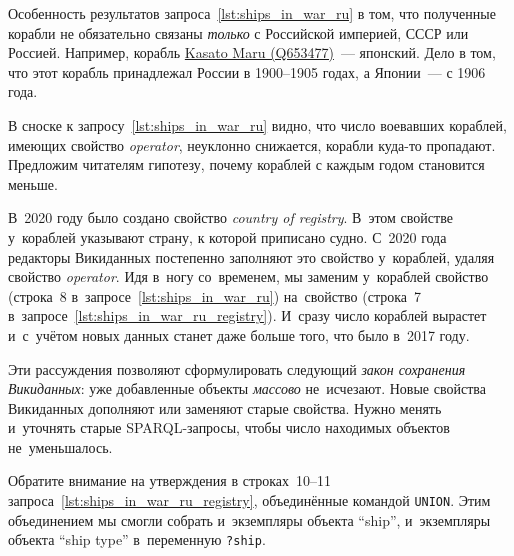 Особенность результатов запроса~\ref{lst:ships_in_war_ru} в том, 
что полученные корабли не обязательно связаны \emph{только} с Российской империей, 
СССР или Россией. 
Например, корабль \href{https://www.wikidata.org/wiki/Q653477}{Kasato Maru (Q653477)}~--- японский. 
Дело в том, что этот корабль принадлежал России в 1900--1905 годах, а Японии~--- с 1906 года.

В сноске к запросу~\ref{lst:ships_in_war_ru} видно, 
что число воевавших кораблей, имеющих свойство \emph{operator}, 
неуклонно снижается, корабли \mbox{куда-то} пропадают. 
Предложим читателям гипотезу, почему кораблей с каждым годом становится меньше. 

В~2020 году было создано свойство \emph{country of registry}. 
В~этом свойстве у~кораблей указывают страну, к которой приписано судно. 
С~2020 года редакторы Викиданных постепенно заполняют это свойство у~кораблей, 
удаляя свойство \emph{operator}.
%
Идя в~ногу со~временем, мы заменим у~кораблей свойство  
(строка~8 в~запросе~\ref{lst:ships_in_war_ru}) 
на~свойство  (строка~7 в~запросе~\ref{lst:ships_in_war_ru_registry}). 
И~сразу число кораблей вырастет и~с~учётом новых данных станет даже больше того, что было в~2017 году. 

Эти рассуждения позволяют сформулировать следующий \emph{закон сохранения Викиданных}: 
уже добавленные объекты \emph{массово} не~исчезают. 
Новые свойства Викиданных дополняют или заменяют старые свойства. 
Нужно менять и~уточнять старые SPARQL-запросы, чтобы число находимых объектов не~уменьшалось.

Обратите внимание на утверждения в строках~10--11 запроса~\ref{lst:ships_in_war_ru_registry}, 
объединённые командой \lstinline{UNION}. 
Этим объединением мы смогли собрать и~экземпляры объекта ``ship'', 
и~экземпляры объекта ``ship type'' в~переменную \lstinline|?ship|.


